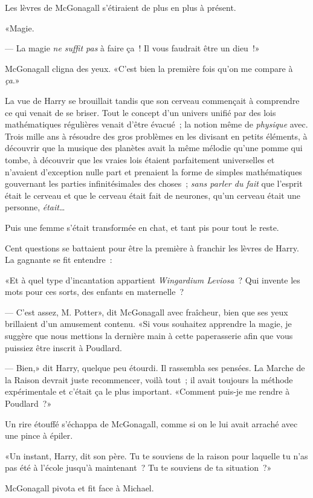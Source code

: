 Les lèvres de McGonagall s'étiraient de plus en plus à présent.

«Magie.

--- La magie \emph{ne suffit pas} à faire ça~! Il vous faudrait être un dieu~!»

McGonagall cligna des yeux. «C'est bien la première fois qu'on me compare à \emph{ça}.»

La vue de Harry se brouillait tandis que son cerveau commençait à comprendre ce qui venait de se briser. Tout le concept d'un univers unifié par des lois mathématiques régulières venait d'être évacué~; la notion même de \emph{physique} avec. Trois mille ans à résoudre des gros problèmes en les divisant en petits éléments, à découvrir que la musique des planètes avait la même mélodie qu'une pomme qui tombe, à découvrir que les vraies lois étaient parfaitement universelles et n'avaient d'exception nulle part et prenaient la forme de simples mathématiques gouvernant les parties infinitésimales des choses~; \emph{sans parler du fait} que l'esprit était le cerveau et que le cerveau était fait de neurones, qu'un cerveau était une personne, \emph{était}…

Puis une femme s'était transformée en chat, et tant pis pour tout le reste.

Cent questions se battaient pour être la première à franchir les lèvres de Harry. La gagnante se fit entendre~:

«Et à quel type d'incantation appartient \emph{Wingardium Leviosa}~? Qui invente les mots pour ces sorts, des enfants en maternelle~?

--- C'est assez, M. Potter», dit McGonagall avec fraîcheur, bien que ses yeux brillaient d'un amusement contenu. «Si vous souhaitez apprendre la magie, je suggère que nous mettions la dernière main à cette paperasserie afin que vous puissiez être inscrit à Poudlard.

--- Bien,» dit Harry, quelque peu étourdi. Il rassembla ses pensées. La Marche de la Raison devrait juste recommencer, voilà tout~; il avait toujours la méthode expérimentale et c'était ça le plus important. «Comment puis-je me rendre à Poudlard~?»

Un rire étouffé s'échappa de McGonagall, comme si on le lui avait arraché avec une pince à épiler.

«Un instant, Harry, dit son père. Tu te souviens de la raison pour laquelle tu n'as pas été à l'école jusqu'à maintenant~? Tu te souviens de ta situation~?»

McGonagall pivota et fit face à Michael.

